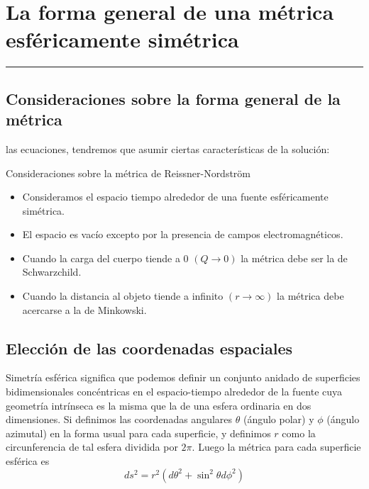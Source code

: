 \section{\huge{La forma general de una métrica esféricamente simétrica}}

\textcolor{myred}{\hrule}

\subsection*{\textbf{Consideraciones sobre la forma general de la métrica}}

 las ecuaciones, tendremos que asumir ciertas características de la solución:

\vspace{0.75cm}

\begin{remarkbox}{Consideraciones sobre la métrica de Reissner-Nordström}
\begin{itemize}
    \item Consideramos el espacio tiempo alrededor de una fuente esféricamente simétrica.
    \item El espacio es vacío excepto por la presencia de campos electromagnéticos.
    \item Cuando la carga del cuerpo tiende a 0 $(Q \to 0)$ la métrica debe ser la de Schwarzchild.
    \item Cuando la distancia al objeto tiende a infinito $(r \to \infty)$ la métrica debe acercarse a la de Minkowski.
\end{itemize}
\end{remarkbox}

\subsection*{\textbf{Elección de las coordenadas espaciales}}

Simetría esférica significa que podemos definir un conjunto anidado de superficies bidimensionales concéntricas en el espacio-tiempo alrededor de la fuente cuya geometría intrínseca es la misma que la de una esfera ordinaria en dos dimensiones. Si definimos las coordenadas angulares $\theta$ (ángulo polar) y $\phi$ (ángulo azimutal) en la forma usual para cada superficie, y definimos $r$ como la circunferencia de tal esfera dividida por $2\pi$. Luego la métrica para cada superficie esférica es 
\begin{equation}
    ds^2 = r^2(d\theta^2+\sin^2{\theta}d\phi^2)
    \label{metricaRN1}
\end{equation}

